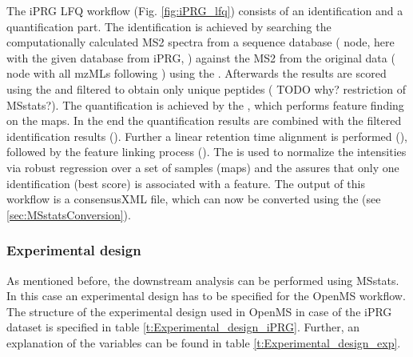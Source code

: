 \noindent The iPRG LFQ workflow (Fig. \ref{fig:iPRG_lfq}) consists of an identification and a quantification part. The identification is achieved by searching the computationally calculated MS2 spectra from a sequence database ( node, here with the given database from iPRG, ) against the MS2 from the original data ( node with all mzMLs following ) using the .
Afterwards the results are scored using the  and filtered to obtain only unique peptides ( TODO why? restriction of MSstats?). The quantification is achieved by the , which performs feature finding on the maps. In the end the quantification results are combined with the filtered identification results (). Further a linear retention time alignment is performed (), followed by the feature linking process (). The  is used to normalize the intensities via robust regression over a set of samples (maps) and the  assures that only one identification (best score) is associated with a feature. The output of this workflow is a consensusXML file, which can now be converted using the  (see \ref{sec:MSstatsConversion}). 

\subsubsection{Experimental design}
\noindent As mentioned before, the downstream analysis can be performed using MSstats. In this case an experimental design has to be specified for the OpenMS workflow. The structure of the experimental design used in OpenMS in case of the iPRG dataset is specified in table \ref{t:Experimental_design_iPRG}. Further, an explanation of the variables can be found in table \ref{t:Experimental_design_exp}. 

